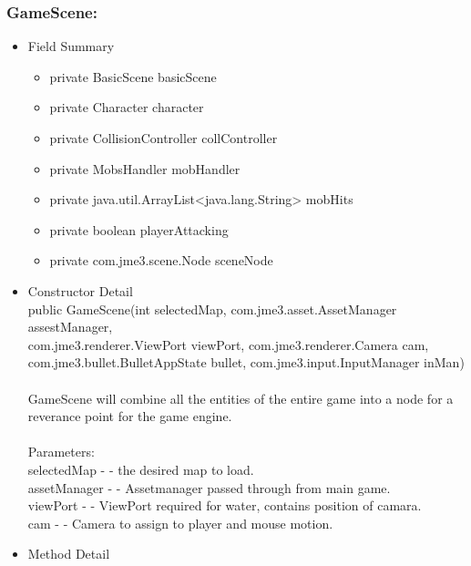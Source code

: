 \documentclass[letterpaper]{article}
\begin{document}
								\subsubsection*{GameScene:}
								\vspace{0.1in}
									\begin{itemize}
										\item	Field Summary
												\begin{itemize}
													\item	private BasicScene	basicScene 
													\item	private Character	character 
													\item	private CollisionController	collController 
													\item	private MobsHandler	mobHandler 
													\item	private java.util.ArrayList<java.lang.String>	mobHits 
													\item	private boolean	playerAttacking 
													\item	private com.jme3.scene.Node	sceneNode 
												\end{itemize}
										\item	Constructor Detail \\
												public GameScene(int selectedMap, com.jme3.asset.AssetManager assestManager,\\
												         com.jme3.renderer.ViewPort viewPort,
												         com.jme3.renderer.Camera cam, \\
												         com.jme3.bullet.BulletAppState bullet,
												         com.jme3.input.InputManager inMan) \\ \\
												GameScene will combine all the entities of the entire game into a node for a reverance point for the game engine. \\ \\
												Parameters: \\
												selectedMap - - the desired map to load. \\
												assetManager - - Assetmanager passed through from main game. \\
												viewPort - - ViewPort required for water, contains position of camara. \\
												cam - - Camera to assign to player and mouse motion.
										\item	Method Detail

\end{itemize}
\end{document}

